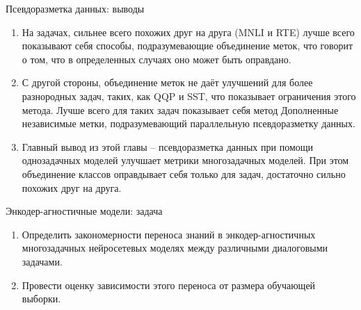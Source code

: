 \begin{frame}{Псевдоразметка данных: выводы}
\begin{enumerate}
\item На задачах, сильнее всего похожих друг на друга (MNLI и RTE) лучше всего показывают себя способы, подразумевающие объединение меток, что говорит о том, что в определенных случаях оно может быть оправдано. 

\item С другой стороны, объединение меток не даёт улучшений для более разнородных задач, таких, как QQP и SST, что показывает ограничения этого метода. Лучше всего для таких задач показывает себя метод Дополненные независимые метки, подразумевающий параллельную псевдоразметку данных. 

\item Главный вывод из этой главы -- псевдоразметка данных при помощи однозадачных моделей улучшает метрики многозадачных моделей. При этом объединение классов оправдывает себя только для задач, достаточно сильно похожих друг на друга. 
\end{enumerate}
\end{frame}

\begin{frame}{Энкодер-агностичные модели: задача}
\begin{enumerate}
    \item Определить закономерности переноса знаний в энкодер-агностичных многозадачных нейросетевых моделях между различными диалоговыми задачами.
    \item Провести оценку зависимости этого переноса от размера обучающей выборки.
 \end{enumerate}
\end{frame}

